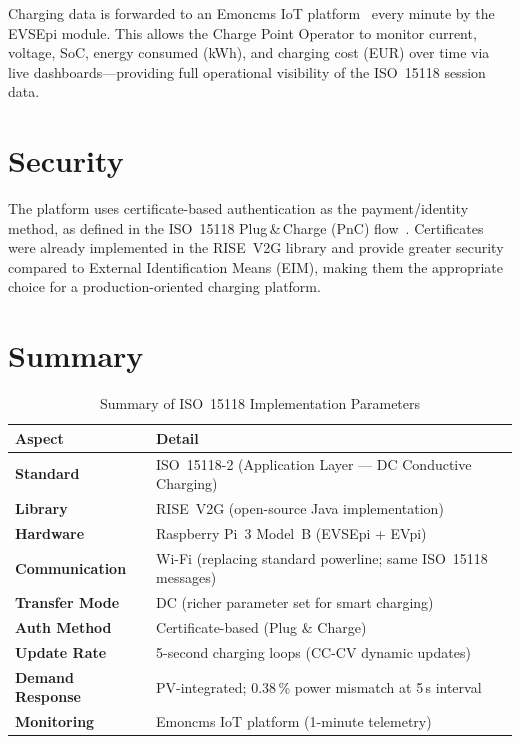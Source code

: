 \documentclass[12pt,a4paper]{report}
\begin{document}
Charging data is forwarded to an Emoncms IoT platform~\autocite{emoncms} every minute by the EVSEpi
module. This allows the Charge Point Operator to monitor current, voltage, SoC, energy consumed
(kWh), and charging cost (EUR) over time via live dashboards---providing full operational
visibility of the ISO~15118 session data.

\section{Security}

The platform uses certificate-based authentication as the payment/identity method, as defined in
the ISO~15118 Plug\,\&\,Charge (PnC) flow~\autocite{iso15118_2022}. Certificates were already
implemented in the RISE~V2G library and provide greater security compared to External
Identification Means (EIM), making them the appropriate choice for a production-oriented
charging platform.

\section{Summary}

\begin{table}[h!]
  \centering
  \caption{Summary of ISO~15118 Implementation Parameters}
  \label{tab:iso15118-summary}
  \renewcommand{\arraystretch}{1.3}
  \begin{tabular}{>{\bfseries}p{4cm} p{9cm}}
    \toprule
    Aspect           & Detail \\
    \midrule
    Standard         & ISO~15118-2 (Application Layer --- DC Conductive Charging)~\autocite{iso15118_2022} \\
    Library          & RISE~V2G (open-source Java implementation)~\autocite{rise_v2g} \\
    Hardware         & Raspberry Pi~3 Model~B (EVSEpi + EVpi) \\
    Communication    & Wi-Fi (replacing standard powerline; same ISO~15118 messages) \\
    Transfer Mode    & DC (richer parameter set for smart charging) \\
    Auth Method      & Certificate-based (Plug \& Charge) \\
    Update Rate      & 5-second charging loops (CC-CV dynamic updates) \\
    Demand Response  & PV-integrated; 0.38\,\% power mismatch at 5\,s interval \\
    Monitoring       & Emoncms IoT platform (1-minute telemetry)~\autocite{emoncms} \\
    \bottomrule
  \end{tabular}
\end{table}
\end{document}

